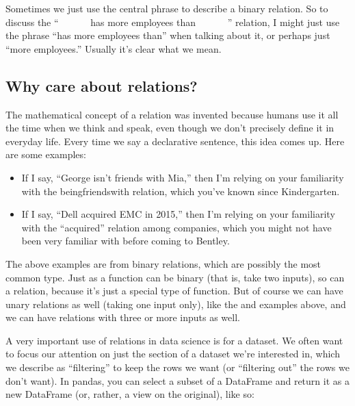 \documentclass[letterpaper,10pt,english]{jupyterBook}
\begin{document}
\sphinxAtStartPar
Sometimes we just use the central phrase to describe a binary relation.  So to discuss the “        has more employees than        ” relation, I might just use the phrase “has more employees than” when talking about it, or perhaps just “more employees.”  Usually it’s clear what we mean.


\subsection{Why care about relations?}
\label{\detokenize{chapter-2-mathematical-foundations:why-care-about-relations}}
\sphinxAtStartPar
The mathematical concept of a relation was invented because humans use it all the time when we think and speak, even though we don’t precisely define it in everyday life.  Every time we say a declarative sentence, this idea comes up.  Here are some examples:
\begin{itemize}
\item {} 
\sphinxAtStartPar
If I say, “George isn’t friends with Mia,” then I’m relying on your familiarity with the being\sphinxhyphen{}friends\sphinxhyphen{}with relation, which you’ve known since Kindergarten.

\item {} 
\sphinxAtStartPar
If I say, “Dell acquired EMC in 2015,” then I’m relying on your familiarity with the “acquired” relation among companies, which you might not have been very familiar with before coming to Bentley.

\end{itemize}

\sphinxAtStartPar
The above examples are from binary relations, which are possibly the most common type.  Just as a function can be binary (that is, take two inputs), so can a relation, because it’s just a special type of function.  But of course we can have unary relations as well (taking one input only), like the  and  examples above, and we can have relations with three or more inputs as well.

\sphinxAtStartPar
A very important use of relations in data science is for  a dataset.  We often want to focus our attention on just the section of a dataset we’re interested in, which we describe as “filtering” to keep the rows we want (or “filtering out” the rows we don’t want).  In pandas, you can select a subset of a DataFrame  and return it as a new DataFrame (or, rather, a view on the original), like so:
\end{document}
